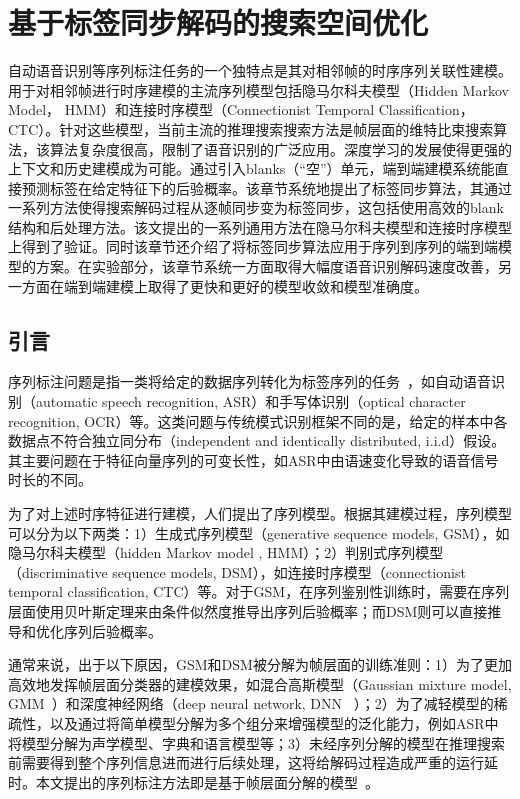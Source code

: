 
\chapter{基于标签同步解码的搜索空间优化}
\label{chap:lsd}
自动语音识别等序列标注任务的一个独特点是其对相邻帧的时序序列关联性建模。用于对相邻帧进行时序建模的主流序列模型包括隐马尔科夫模型（Hidden Markov Model， HMM）和连接时序模型（Connectionist Temporal Classification， CTC）。针对这些模型，当前主流的推理搜索搜索方法是帧层面的维特比束搜索算法，该算法复杂度很高，限制了语音识别的广泛应用。深度学习的发展使得更强的上下文和历史建模成为可能。通过引入blanks（“空”）单元，端到端建模系统能直接预测标签在给定特征下的后验概率。该章节系统地提出了标签同步算法，其通过一系列方法使得搜索解码过程从逐帧同步变为标签同步，这包括使用高效的blank结构和后处理方法。该文提出的一系列通用方法在隐马尔科夫模型和连接时序模型上得到了验证。同时该章节还介绍了将标签同步算法应用于序列到序列的端到端模型的方案。在实验部分，该章节系统一方面取得大幅度语音识别解码速度改善，另一方面在端到端建模上取得了更快和更好的模型收敛和模型准确度。


\section{引言}
\label{chap:lsd-intro}
序列标注问题是指一类将给定的数据序列转化为标签序列的任务~\cite{graves2012supervised}，如自动语音识别（automatic speech recognition, ASR）和手写体识别（optical character recognition, OCR）等。这类问题与传统模式识别框架不同的是，给定的样本中各数据点不符合独立同分布（independent and identically distributed, i.i.d）假设。其主要问题在于特征向量序列的可变长性，如ASR中由语速变化导致的语音信号时长的不同。

为了对上述时序特征进行建模，人们提出了序列模型。根据其建模过程，序列模型可以分为以下两类：1）生成式序列模型（generative sequence models, GSM），如隐马尔科夫模型（hidden Markov model , HMM）；2）判别式序列模型（discriminative sequence models, DSM），如连接时序模型（connectionist temporal classification, CTC）等。对于GSM，在序列鉴别性训练时，需要在序列层面使用贝叶斯定理来由条件似然度推导出序列后验概率；而DSM则可以直接推导和优化序列后验概率。

通常来说，出于以下原因，GSM和DSM被分解为帧层面的训练准则：1）为了更加高效地发挥帧层面分类器的建模效果，如混合高斯模型（Gaussian mixture model, GMM~\cite{woodland1994large}）和深度神经网络（deep neural network, DNN ~\cite{hinton2012deep}）；2）为了减轻模型的稀疏性，以及通过将简单模型分解为多个组分来增强模型的泛化能力，例如ASR中将模型分解为声学模型、字典和语言模型等；3）未经序列分解的模型在推理搜索前需要得到整个序列信息进而进行后续处理，这将给解码过程造成严重的运行延时。本文提出的序列标注方法即是基于帧层面分解的模型~\cite{forney1973viterbi,mohri2002weighted}。

